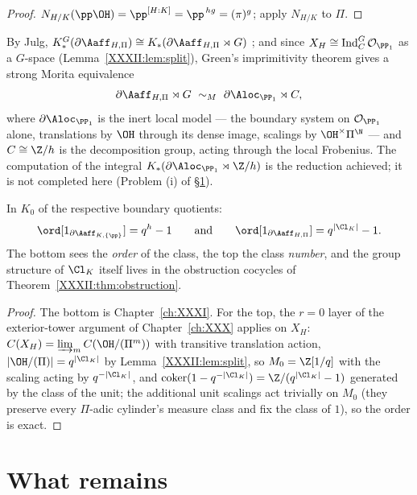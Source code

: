 \begin{proof}
$N_{H/K}(\pp\OH)=\pp^{[H:K]}=\pp^{\,hg}=(\pi)^g$; apply $N_{H/K}$ to $\Pi$.
\end{proof}

\begin{theorem}\label{XXXII:thm:imprimitivity}
By Julg, $K_*^G(\partial\Aaff_{H,\Pi})\cong K_*(\partial\Aaff_{H,\Pi}\rtimes G)$
\cite{Julg}; and since $X_H\cong\mathrm{Ind}_C^G\,\mathcal O_{\PP_1}$ as a $G$-space
(Lemma~\ref{XXXII:lem:split}), Green's imprimitivity theorem \cite{Green} gives a strong Morita
equivalence
\[
\partial\Aaff_{H,\Pi}\rtimes G\ \sim_{M}\
\partial\Aloc_{\PP_1}\rtimes C,
\]
where $\partial\Aloc_{\PP_1}$ is the inert local model --- the boundary
system on $\mathcal O_{\PP_1}$ alone, translations by $\OH$ through its dense image,
scalings by $\OH^\times\Pi^{\N}$ --- and $C\cong\Z/h$ is the decomposition group,
acting through the local Frobenius. The computation of the integral
$K_*(\partial\Aloc_{\PP_1}\rtimes\Z/h)$ is the reduction achieved; it is
not completed here (Problem (i) of \S\ref{XXXII:sec:remaining}).
\end{theorem}

\begin{theorem}\label{XXXII:thm:ladder}
In $K_0$ of the respective boundary quotients:
\[
\ord[1_{\partial\Aaff_{K,\{\pp\}}}]=q^{h}-1
\qquad\text{and}\qquad
\ord[1_{\partial\Aaff_{H,\Pi}}]=q^{|\Cl_K|}-1 .
\]
The bottom sees the \emph{order} of the class, the top the class \emph{number}, and the
group structure of $\Cl_K$ itself lives in the obstruction cocycles of
Theorem~\ref{XXXII:thm:obstruction}.
\end{theorem}

\begin{proof}
The bottom is Chapter~\ref{ch:XXXI}. For the top, the $r=0$ layer of the exterior-tower argument of
Chapter~\ref{ch:XXX} applies on $X_H$: $C(X_H)=\varinjlim_mC(\OH/(\Pi^m))$ with transitive
translation action, $|\OH/(\Pi)|=q^{|\Cl_K|}$ by Lemma~\ref{XXXII:lem:split}, so
$M_0=\Z[1/q]$ with the scaling acting by $q^{-|\Cl_K|}$, and
$\operatorname{coker}(1-q^{-|\Cl_K|})=\Z/(q^{|\Cl_K|}-1)$ generated by the class of the
unit; the additional unit scalings act trivially on $M_0$ (they preserve every
$\Pi$-adic cylinder's measure class and fix the class of $1$), so the order is exact.
\end{proof}

\section{What remains}\label{XXXII:sec:remaining}

